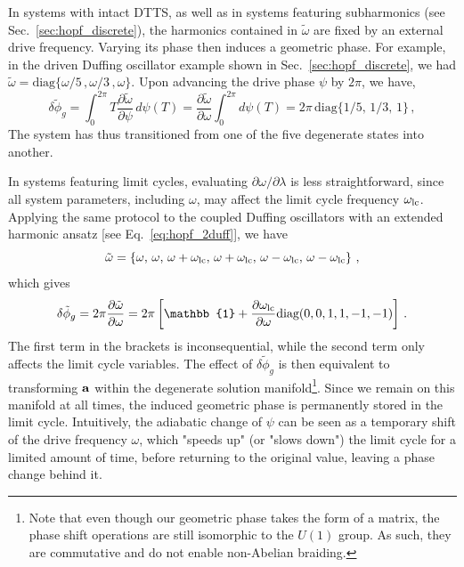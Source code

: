 In systems with intact DTTS, as well as in systems featuring subharmonics (see Sec.~\ref{sec:hopf_discrete}), the harmonics contained in $\tilde{\omega}$ are fixed by an external drive frequency. Varying its phase then induces a geometric phase. For example, in the driven Duffing oscillator example shown in Sec.~\ref{sec:hopf_discrete}, we had $\tilde{\omega} = \text{diag} \{\omega/5 \,, \omega/3 \,, \omega\}$. Upon advancing the drive phase $\psi$ by $2\pi$, we have,
\begin{equation}
\delta \tilde{\phi}_g = \int_0^{2\pi} T \frac{\partial \tilde{\omega}}{\partial \psi} \, d\psi(T) =  \frac{\partial \tilde{\omega}}{\partial \omega} \int_0^{2\pi} d\psi(T) = 2\pi\, \text{diag}\{1/5 ,\, 1/3, \, 1\}\,,
\end{equation}
The system has thus transitioned from one of the five degenerate states into another. %

In systems featuring limit cycles, evaluating $\partial{\omega} / \partial \lambda$ is less straightforward, since all system parameters, including $\omega$, may affect the limit cycle frequency $\omega_{\rm lc}$. Applying the same protocol to the coupled Duffing oscillators with an extended harmonic ansatz [see Eq.~\eqref{eq:hopf_2duff}], we have
\begin{equation}
\tilde{\omega} = \left \{ \omega ,\, \omega ,\, \omega + \omega_{\rm lc} ,\,  \omega + \omega_{\rm lc} ,\,  \omega - \omega_{\rm lc} , \,  \omega - \omega_{\rm lc} \right\} \,,
\end{equation}
which gives
\begin{equation} \label{eq:hopf_geoshift}
\delta \tilde{\phi}_g = 2 \pi \frac{\partial \tilde{\omega}}{\partial \omega} = 2\pi \left[\mathbb{1} + \frac{\partial \omega_{\rm lc}}{\partial \omega } \text{diag}(0,0,1,1,-1,-1) \right]  \,.
\end{equation}
The first term in the brackets is inconsequential, while the second term only affects the limit cycle variables. The effect of $\delta \tilde{\phi}_g$ is then equivalent to transforming $\vb{a}$ within the degenerate solution manifold\footnote{Note that even though our geometric phase takes the form of a matrix, the phase shift operations are still isomorphic to the $U(1)$ group. As such, they are commutative and do not enable non-Abelian braiding.}. Since we remain on this manifold at all times, the induced geometric phase is permanently stored in the limit cycle. Intuitively, the adiabatic change of $\psi$ can be seen as a temporary shift of the drive frequency $\omega$, which "speeds up" (or "slows down") the limit cycle for a limited amount of time, before returning to the original value, leaving a phase change behind it.

